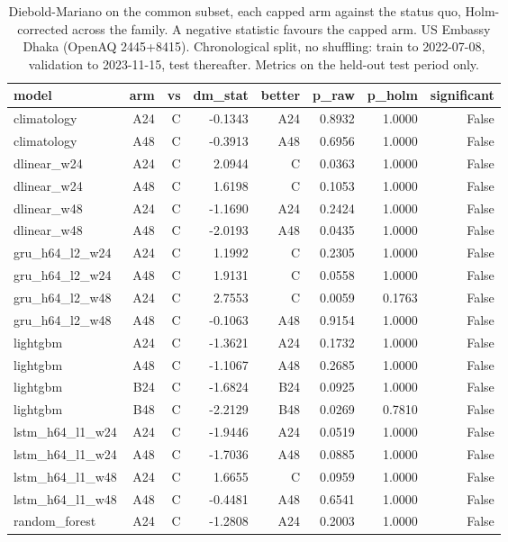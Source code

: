 \begin{table}[htbp]
\caption{Diebold-Mariano on the common subset, each capped arm against the status quo, Holm-corrected across the family. A negative statistic favours the capped arm. US Embassy Dhaka (OpenAQ 2445+8415). Chronological split, no shuffling: train to 2022-07-08, validation to 2023-11-15, test thereafter. Metrics on the held-out test period only.}
\label{tab:lookback_dm_tests}
\begin{tabular}{lrrrrrrr}
\toprule
model & arm & vs & dm\_stat & better & p\_raw & p\_holm & significant \\
\midrule
climatology & A24 & C & -0.1343 & A24 & 0.8932 & 1.0000 & False \\
climatology & A48 & C & -0.3913 & A48 & 0.6956 & 1.0000 & False \\
dlinear\_w24 & A24 & C & 2.0944 & C & 0.0363 & 1.0000 & False \\
dlinear\_w24 & A48 & C & 1.6198 & C & 0.1053 & 1.0000 & False \\
dlinear\_w48 & A24 & C & -1.1690 & A24 & 0.2424 & 1.0000 & False \\
dlinear\_w48 & A48 & C & -2.0193 & A48 & 0.0435 & 1.0000 & False \\
gru\_h64\_l2\_w24 & A24 & C & 1.1992 & C & 0.2305 & 1.0000 & False \\
gru\_h64\_l2\_w24 & A48 & C & 1.9131 & C & 0.0558 & 1.0000 & False \\
gru\_h64\_l2\_w48 & A24 & C & 2.7553 & C & 0.0059 & 0.1763 & False \\
gru\_h64\_l2\_w48 & A48 & C & -0.1063 & A48 & 0.9154 & 1.0000 & False \\
lightgbm & A24 & C & -1.3621 & A24 & 0.1732 & 1.0000 & False \\
lightgbm & A48 & C & -1.1067 & A48 & 0.2685 & 1.0000 & False \\
lightgbm & B24 & C & -1.6824 & B24 & 0.0925 & 1.0000 & False \\
lightgbm & B48 & C & -2.2129 & B48 & 0.0269 & 0.7810 & False \\
lstm\_h64\_l1\_w24 & A24 & C & -1.9446 & A24 & 0.0519 & 1.0000 & False \\
lstm\_h64\_l1\_w24 & A48 & C & -1.7036 & A48 & 0.0885 & 1.0000 & False \\
lstm\_h64\_l1\_w48 & A24 & C & 1.6655 & C & 0.0959 & 1.0000 & False \\
lstm\_h64\_l1\_w48 & A48 & C & -0.4481 & A48 & 0.6541 & 1.0000 & False \\
random\_forest & A24 & C & -1.2808 & A24 & 0.2003 & 1.0000 & False \\

\end{tabular}
\end{table}
